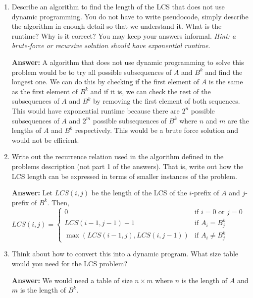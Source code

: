 \documentclass[12pt,letterpaper]{article}
\begin{document}
\begin{enumerate}
    \item Describe an algorithm to find the length of the LCS that does not use dynamic programming. 
    You do not have to write pseudocode, simply describe the algorithm in enough detail so that we understand it. 
    What is the runtime?
    Why is it correct?
    You may keep your answers informal. 
    \textit{Hint: a brute-force  or recursive solution should have exponential runtime.}
    \vspace{0.5cm}

    \textbf{Answer:}
    A algorithm that does not use dynamic programming to solve this problem would be to try all possible subsequences of $A$ and $B^k$ and find the longest one. 
    We can do this by checking if the first element of $A$ is the same as the first element of $B^k$ and if it is, we can check the rest of the subsequences of 
    $A$ and $B^k$ by removing the first element of both sequences. 
    This would have exponential runtime because there are $2^n$ possible subsequences of $A$ and $2^m$ 
    possible subsequences of $B^k$ where $n$ and $m$ are the lengths of $A$ and $B^k$ respectively. This would be a brute force solution and would not be efficient.
    \vspace{0.5cm}
    
    \item Write out the recurrence relation used in the algorithm defined in the problems description (not part 1 of the answers). 
    That is, write out how the LCS length can be expressed in terms of smaller instances of the problem.
    \vspace{0.5cm}

    \textbf{Answer:}
    Let $LCS(i,j)$ be the length of the LCS of the $i$-prefix of $A$ and $j$-prefix of $B^k$. 
    Then, $LCS(i,j) = \begin{cases}
        0 & \text{if } i=0 \text{ or } j=0 \\
        LCS(i-1,j-1)+1 & \text{if } A_i=B^k_j \\
        \max(LCS(i-1,j),LCS(i,j-1)) & \text{if } A_i \neq B^k_j
    \end{cases}$

    \item Think about how to convert this into a dynamic program. What size table would you need for the LCS problem?
    \vspace{0.5cm}

    \textbf{Answer:}
    We would need a table of size $n\times m$ where $n$ is the length of $A$ and $m$ is the length of $B^k$. 


\end{enumerate}
\end{document}
